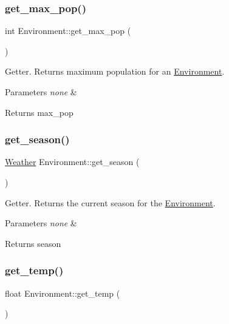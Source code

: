 \subsubsection{\texorpdfstring{get\+\_\+max\+\_\+pop()}{get\_max\_pop()}}
{\footnotesize\ttfamily int Environment\+::get\+\_\+max\+\_\+pop (\begin{DoxyParamCaption}{ }\end{DoxyParamCaption})}

Getter. Returns maximum population for an \hyperlink{class_environment}{Environment}. 
\begin{DoxyParams}{Parameters}
{\em none} & \\
\hline
\end{DoxyParams}
\begin{DoxyReturn}{Returns}
max\+\_\+pop 
\end{DoxyReturn}
\mbox{\label{class_environment_a14b790bd9ce0b0a90373e852790d77bd}} 
\subsubsection{\texorpdfstring{get\+\_\+season()}{get\_season()}}
{\footnotesize\ttfamily \hyperlink{class_weather}{Weather} Environment\+::get\+\_\+season (\begin{DoxyParamCaption}{ }\end{DoxyParamCaption})}

Getter. Returns the current season for the \hyperlink{class_environment}{Environment}. 
\begin{DoxyParams}{Parameters}
{\em none} & \\
\hline
\end{DoxyParams}
\begin{DoxyReturn}{Returns}
season 
\end{DoxyReturn}
\mbox{\label{class_environment_a7d2421a61589319e51acb4692aeacd3a}} 
\subsubsection{\texorpdfstring{get\+\_\+temp()}{get\_temp()}}
{\footnotesize\ttfamily float Environment\+::get\+\_\+temp (\begin{DoxyParamCaption}{ }\end{DoxyParamCaption})}

